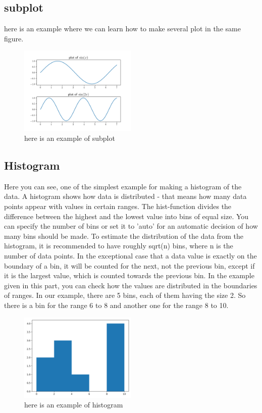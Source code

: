 \documentclass[10pt,a4paper]{article}
\begin{document}
\subsection{subplot}
here is an example where we can learn how to make several plot in the same figure.

\begin{figure}[htbp]\centering
\caption{here is an example of subplot}
\includegraphics[width=0.5\textwidth]{subplot.png}
\end{figure}


\subsection{Histogram}
Here you can see, one of the simplest example for making a histogram of the data. 
A histogram shows how data is distributed - that means how many  data points appear with values in certain ranges.
The hist-function divides the difference between the highest and the lowest value into bins of equal size. You can specify the number of bins or set it to 'auto' for an automatic decision of how many bins should be made.
To estimate the distribution of the data from the histogram, it is recommended to have roughly sqrt(n)
 bins, where n is the number of data points.
 In the exceptional case that a data value is exactly on the boundary of a bin, it will be counted for the next, not the previous bin, except if it is the largest value, which is counted towards the previous bin. In the example given in this part, you can check how the values are distributed in the boundaries of ranges. 
 In our example, there are 5 bins, each of them having the size 2. So there is a bin for the range 6 to 8 and another one for the range 8 to 10.

\begin{figure}[htbp]\centering
\caption{here is an example of histogram}
\includegraphics[width=0.5\textwidth]{histogram.png}
\end{figure}
\end{document}
